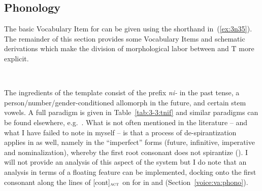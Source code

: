 \begin{exe}
\begin{xlist}
\begin{xlist}
\begin{exe}
\begin{xlist}
\begin{xlist}
\begin{exe}
\begin{xlist}
\begin{xlist}
\begin{exe}
\begin{exe}
\begin{xlist}
\begin{exe}
\begin{exe}
\begin{xlist}
\begin{exe}
\begin{exe}
\begin{exe}
\begin{exe}
\begin{exe}
\begin{xlist}
\begin{exe}
\begin{xlist}
\begin{exe}
\begin{exe}
\begin{xlist}
\begin{exe}
\begin{xlist}
\begin{exe}
\begin{xlist}
\begin{exe}
\begin{exe}
\begin{exe}
\begin{xlist}
\begin{exe}
\begin{exe}
\begin{exe}
\begin{xlist}
\begin{exe}
\begin{xlist}
\begin{exe}
\begin{xlist}
\begin{exe}
\begin{xlist}
\begin{exe}
\begin{exe}
	\subsection{Phonology} \label{vz:vz:phono}
The basic Vocabulary Item for {\vz} can be given using the shorthand in~(\ref{ex:3n35}). The remainder of this section provides some Vocabulary Items and schematic derivations which make the division of morphological labor between {\vz} and T more explicit.
 \begin{exe}
\ex  \label{ex:3n35}{\vz} \lra~{\tnif} 
 \z 

\label{r1:3:3}The ingredients of the template {\tnif} consist of the prefix \emph{ni-} in the past tense, a person/number/gender-conditioned allomorph in the future, and certain stem vowels. A full paradigm is given in Table~\ref{tab:3-3:tnif} and similar paradigms can be found elsewhere, e.g.~\cite{schwarzwald08}. What is not often mentioned in the literature -- and what I have failed to note in \cite{kastner18nllt} myself -- is that a process of de-spirantization applies in {\tnif} as well, namely in the ``imperfect'' forms (future, infinitive, imperative and nominalization), whereby the first root consonant does not spirantize (). I will not provide an analysis of this aspect of the system but I do note that an analysis in terms of a floating feature can be implemented, docking onto the first consonant along the lines of [\textminus{}cont]$_{\text{\gsc{ACT}}}$ on  for {\va} in {\tpie} and {\thit} (Section~\ref{voice:va:phono}).


\end{exe}
\end{exe}
\end{exe}
\end{xlist}
\end{exe}
\end{xlist}
\end{exe}
\end{xlist}
\end{exe}
\end{xlist}
\end{exe}
\end{exe}
\end{exe}
\end{xlist}
\end{exe}
\end{exe}
\end{exe}
\end{xlist}
\end{exe}
\end{xlist}
\end{exe}
\end{xlist}
\end{exe}
\end{exe}
\end{xlist}
\end{exe}
\end{xlist}
\end{exe}
\end{exe}
\end{exe}
\end{exe}
\end{exe}
\end{xlist}
\end{exe}
\end{exe}
\end{xlist}
\end{exe}
\end{exe}
\end{xlist}
\end{xlist}
\end{exe}
\end{xlist}
\end{xlist}
\end{exe}
\end{xlist}
\end{xlist}
\end{exe}
